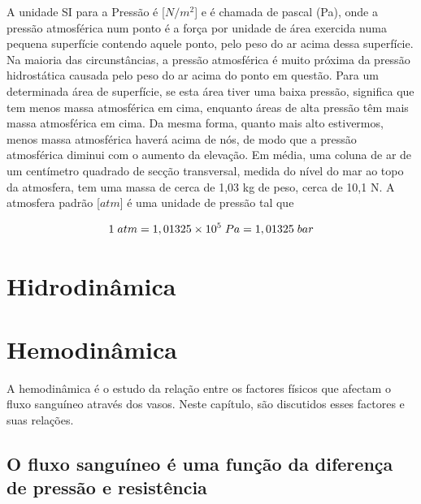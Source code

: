 \documentclass[
  portuguese,
  ]{book}
\begin{document}
A unidade SI para a Pressão é {[}\(N/m^2\){]} e é chamada de pascal (Pa), onde a pressão atmosférica num ponto é a força por unidade de área exercida numa pequena superfície contendo aquele ponto, pelo peso do ar acima dessa superfície. Na maioria das circunstâncias, a pressão atmosférica é muito próxima da pressão hidrostática causada pelo peso do ar acima do ponto em questão. Para um determinada área de superfície, se esta área tiver uma baixa pressão, significa que tem menos massa atmosférica em cima, enquanto áreas de alta pressão têm mais massa atmosférica em cima. Da mesma forma, quanto mais alto estivermos, menos massa atmosférica haverá acima de nós, de modo que a pressão atmosférica diminui com o aumento da elevação. Em média, uma coluna de ar de um centímetro quadrado de secção transversal, medida do nível do mar ao topo da atmosfera, tem uma massa de cerca de 1,03 kg de peso, cerca de 10,1 N. A atmosfera padrão {[}\(atm\){]} é uma unidade de pressão tal que

\begin{equation}
1 \hspace{0.1cm}atm = 1,01325 \times 10^5 \hspace{0.1cm} Pa = 1,01325 \hspace{0.1cm}bar
\label{eq:hidros5}
\end{equation}

\hypertarget{hidrodinuxe2mica}{%
\chapter{Hidrodinâmica}\label{hidrodinuxe2mica}}

\hypertarget{hemodinuxe2mica}{%
\chapter{Hemodinâmica}\label{hemodinuxe2mica}}

A hemodinâmica é o estudo da relação entre os factores físicos que afectam o fluxo sanguíneo através dos vasos. Neste capítulo, são discutidos esses factores e suas relações.

\hypertarget{o-fluxo-sanguuxedneo-uxe9-uma-funuxe7uxe3o-da-diferenuxe7a-de-pressuxe3o-e-resistuxeancia}{%
\section{O fluxo sanguíneo é uma função da diferença de pressão e resistência}\label{o-fluxo-sanguuxedneo-uxe9-uma-funuxe7uxe3o-da-diferenuxe7a-de-pressuxe3o-e-resistuxeancia}}
\end{document}
